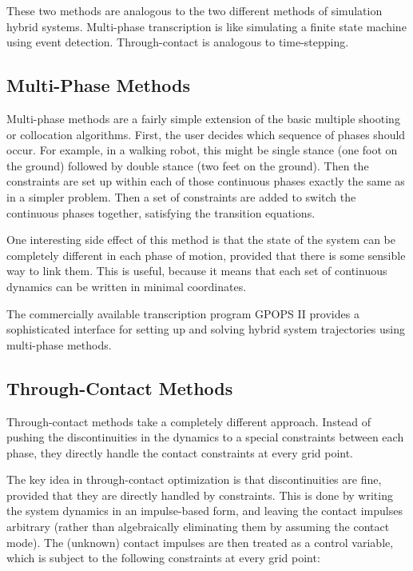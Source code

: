 \par These two methods are analogous to the two different methods of simulation hybrid systems. Multi-phase transcription is like simulating a finite state machine using event detection. Through-contact is analogous to time-stepping.

\subsection{Multi-Phase Methods}

Multi-phase methods are a fairly simple extension of the basic multiple shooting or collocation algorithms. First, the user decides which sequence of phases should occur. For example, in a walking robot, this might be single stance (one foot on the ground) followed by double stance (two feet on the ground). Then the constraints are set up within each of those continuous phases exactly the same as in a simpler problem. Then a set of constraints are added to switch the continuous phases together, satisfying the transition equations.

\par One interesting side effect of this method is that the state of the system can be completely different in each phase of motion, provided that there is some sensible way to link them. This is useful, because it means that each set of continuous dynamics can be written in minimal coordinates.

\par The commercially available transcription program GPOPS II \cite{Patterson2013} provides a sophisticated interface for setting up and solving hybrid system trajectories using multi-phase methods.

\subsection{Through-Contact Methods}

Through-contact methods take a completely different approach. Instead of pushing the discontinuities in the dynamics to a special constraints between each phase, they directly handle the contact constraints at every grid point.

\par The key idea in through-contact optimization is that discontinuities are fine, provided that they are directly handled by constraints. This is done by writing the system dynamics in an impulse-based form, and leaving the contact impulses arbitrary (rather than algebraically eliminating them by assuming the contact mode). The (unknown) contact impulses are then treated as a control variable, which is subject to the following constraints at every grid point:

